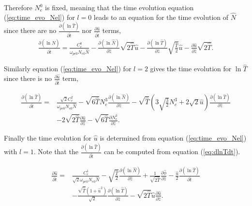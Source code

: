 \documentclass[final]{jpp}
\begin{document}

Therefore $ N_e^0 $ is fixed, meaning that the time evolution equation (\ref{eq:time_evo_Nel}) for $ l=0 $ leads to an equation for the time evolution of $\hat{N}$ since there are no $\frac{\partial (\ln\hat{T})}{\partial \hat{t}}$ nor $\frac{\partial \hat{u}}{\partial \hat{t}}$ terms,
\begin{align}
    \frac{\partial (\ln \hat{N})}{\partial \hat{t}}=\frac{C_e^0}{\omega_{pe0}N_{e0}\hat{N}}-\frac{\partial (\ln \hat{N})}{\partial \hat{z}} \sqrt{2\hat{T}}\hat{u} -\frac{\partial (\ln \hat{T})}{\partial \hat{z}} \sqrt{\frac{\hat{T}}{2}}\hat{u} - \frac{\partial \hat{u}}{\partial \hat{z}}\sqrt{2\hat{T}} \label{eq:dlnNdt}.
\end{align}

Similarly equation (\ref{eq:time_evo_Nel}) for $l=2$ gives the time evolution for $\ln \hat T$ since there is no $\frac{\partial \hat{u}}{\partial \hat{t}}$ term,

\begin{align}
    \frac{\partial(\ln \hat T)}{\partial \hat t} =& 
    \frac{\sqrt{2}C_e^2}{\omega_{pe0}N_{e0}\hat{N}}
    -\sqrt{6\hat{T}}N_e^3 \frac{\partial(\ln\hat{N})}{\partial \hat{z}}
    -\sqrt{\hat{T}}\left(3\sqrt{\frac{3}{2}}N_e^3+2\sqrt{2}\hat{u}\right)\frac{\partial(\ln \hat{T})}{\partial \hat{z}} \nonumber\\
    &- 2\sqrt{2\hat{T}} \frac{\partial \hat{u}}{\partial \hat{z}} 
    - \sqrt{6\hat{T}} \frac{\partial N_e^3}{\partial\hat{z}} \label{eq:dlnTdt}.
\end{align}

Finally the time evolution for $\hat{u}$ is determined from equation (\ref{eq:time_evo_Nel}) with $l=1$. Note that the $\frac{\partial (\ln\hat{T})}{\partial \hat{t}}$ can be computed from equation (\ref{eq:dlnTdt}).

\begin{align}
    \frac{\partial \hat{u}}{\partial \hat t} =& 
    \frac{C_e^1}{\sqrt{2}\omega_{pe0}N_{e0}\hat{N}}
    -\sqrt{\frac{\hat{T}}{2}} \frac{\partial(\ln\hat{N})}{\partial \hat{z}}
    +\frac{1}{\sqrt{2\hat{T}}}\frac{\partial \hat{\phi}}{\partial \hat{z}}
    - \frac{\hat{u}}{2}  \frac{\partial (\ln\hat{T})}{\partial \hat{t}} \nonumber \\
    &-\frac{\sqrt{\hat{T}}(1+\hat{u}^2)}{\sqrt{2}} \frac{\partial(\ln \hat{T})}{\partial \hat{z}}
    - \sqrt{2\hat{T}} \hat{u} \frac{\partial \hat{u}}{\partial \hat{z}}
    \label{eq:dudt}.
\end{align}
\end{document}
